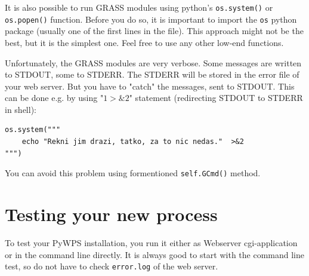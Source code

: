 \documentclass[a4paper,11pt]{article}
\begin{document}

It is also possible to run GRASS modules using python's
\texttt{os.system()} or \texttt{os.popen()} function.  Before you do so, it
is important to import the \texttt{os} python package (usually one of the
first lines in the file). This approach might not be the best, but it is
the simplest one. Feel free to use any other low-end functions.
    
    
Unfortunately, the GRASS modules are very verbose. Some messages are
written to STDOUT, some to STDERR. The STDERR will be stored in the error
file of your web server. But you have to "catch" the messages, sent to
STDOUT. This can be done e.g. by using "$1>\&2$" statement (redirecting
STDOUT to STDERR in shell):

\begin{verbatim}
os.system("""
    echo "Rekni jim drazi, tatko, za to nic nedas."  >&2
""")
\end{verbatim}

You can avoid this problem using formentioned \texttt{self.GCmd()} method.


\section{Testing your new process}

To test your PyWPS installation, you run it either as Webserver
cgi-application or in the command line directly. It is always good to start
with the command line test, so do not have to check \texttt{error.log} of
the web server.
\end{document}
